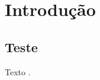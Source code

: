 

\chapter{Introdução} \label{cha:introdução}

\section{Teste} \label{sec:teste}

Texto \cite{anderson20, campostimini22, do09}.


